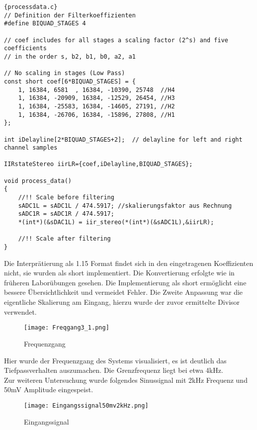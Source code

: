 \begin{adjustbox}{width=\textwidth,height=\textheight,keepaspectratio}
 \begin{lstlisting}[title=processdata.c]{processdata.c}
// Definition der Filterkoeffizienten
#define BIQUAD_STAGES 4

// coef includes for all stages a scaling factor (2^s) and five coefficients
// in the order s, b2, b1, b0, a2, a1

// No scaling in stages (Low Pass)
const short coef[6*BIQUAD_STAGES] = {
	1, 16384, 6581	, 16384, -10390, 25748  //H4
	1, 16384, -20909, 16384, -12529, 26454, //H3
	1, 16384, -25583, 16384, -14605, 27191, //H2
	1, 16384, -26706, 16384, -15896, 27808, //H1
};

int iDelayline[2*BIQUAD_STAGES+2];	// delayline for left and right channel samples

IIRstateStereo iirLR={coef,iDelayline,BIQUAD_STAGES};

void process_data()
{
	//!! Scale before filtering
	sADC1L = sADC1L / 474.5917; //skalierungsfaktor aus Rechnung
	sADC1R = sADC1R / 474.5917;
	*(int*)(&sDAC1L) = iir_stereo(*(int*)(&sADC1L),&iirLR);

	//!! Scale after filtering
}

\end{lstlisting}
\end{adjustbox}
Die Interprätierung als 1.15 Format findet sich in den eingetragenen Koeffizienten nicht, sie wurden als short implementiert. Die Konvertierung erfolgte wie in früheren Laborübungen gesehen. Die Implementierung als short ermöglicht eine bessere Übersichtlichkeit und vermeidet Fehler. Die Zweite Anpassung war die eigentliche Skalierung am Eingang, hierzu wurde der zuvor ermittelte Divisor verwendet.\\
\begin{figure}[H]
  \centering
    \texttt{[image: Freqgang3\_1.png]}
  \caption{Frequenzgang}
  \label{fig:Freqgang3_1}
\end{figure}
Hier wurde der Frequenzgang des Systems visualisiert, es ist deutlich das Tiefpassverhalten auszumachen. Die Grenzfrequenz liegt bei etwa 4kHz.\\
Zur weiteren Untersuchung wurde folgendes Sinussignal mit 2kHz Frequenz und 50mV Amplitude eingespeist.
\begin{figure}[H]
  \centering
    \texttt{[image: Eingangssignal50mv2kHz.png]}
  \caption{Eingangssignal}
  \label{fig:Eingangssignal50mv2kHz}
\end{figure}
